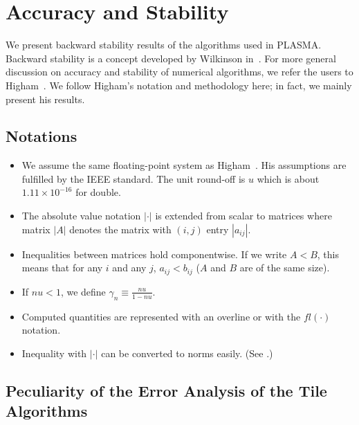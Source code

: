 
\chapter{Accuracy and Stability}
\newtheorem{theorem}{Theorem}[section]



We present backward stability results of the algorithms used in PLASMA.
Backward stability is a concept developed by Wilkinson in~\cite{Wilkinson:1963:REA,Wilkinson:1965:AEP}.
For more general discussion on accuracy and stability of numerical algorithms, we refer the users to Higham~\cite{Higham:2002:ASN}.
We follow Higham's notation and methodology here; in fact, we mainly present his results.

\section{Notations}
\begin{itemize}
\item We assume the same floating-point system as Higham~\cite{Higham:2002:ASN}. His
assumptions are fulfilled by the IEEE standard. The unit round-off is $u$
which is about $1.11\times 10^{-16}$ for double.

\item The absolute value notation $|\cdot|$ is extended from scalar to matrices
where matrix $|A|$ denotes the matrix with $(i,j)$ entry $|a_{ij}|$.

\item Inequalities between matrices hold componentwise. If we write $A<B$,
this means that for any $i$ and any $j$,
$a_{ij}<b_{ij}$ ($A$ and $B$ are of the same size).

\item If $nu<1$, we define $\gamma_n \equiv \frac{nu}{1-nu}$.

\item Computed quantities are represented with an overline or with the $fl(\cdot)$ notation.

\item Inequality with $|\cdot|$ can be converted to norms easily. (See \cite[Lem.6.6]{Higham:2002:ASN}.)
\end{itemize}

\section{Peculiarity of the Error Analysis of the Tile Algorithms}

